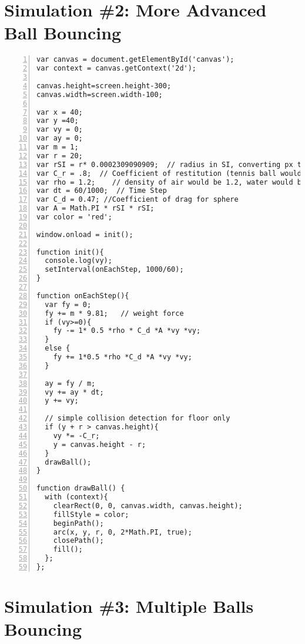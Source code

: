 \section{Simulation \#2: More Advanced Ball Bouncing}

\begin{lstlisting}[breaklines=true, frame=single, numbers=left, caption=More Advanced Ball Bouncing Simulation label=lst:ballbounce2]
var canvas = document.getElementById('canvas');
var context = canvas.getContext('2d');

canvas.height=screen.height-300;
canvas.width=screen.width-100;

var x = 40;
var y =40;
var vy = 0;
var ay = 0;
var m = 1;
var r = 20;
var rSI = r* 0.0002309090909;  // radius in SI, converting px to m
var C_r = .8;  // Coefficient of restitution (tennis ball would be .8)
var rho = 1.2;    // density of air would be 1.2, water would be 1000
var dt = 60/1000;  // Time Step
var C_d = 0.47; //Coefficient of drag for sphere
var A = Math.PI * rSI * rSI;
var color = 'red';

window.onload = init();
  
function init(){
  console.log(vy);
  setInterval(onEachStep, 1000/60);
}

function onEachStep(){ 
  var fy = 0;
  fy += m * 9.81;   // weight force
  if (vy>=0){
    fy -= 1* 0.5 *rho * C_d *A *vy *vy; 
  } 
  else {
    fy += 1*0.5 *rho *C_d *A *vy *vy;
  }

  ay = fy / m;
  vy += ay * dt;
  y += vy;
  
  // simple collision detection for floor only
  if (y + r > canvas.height){ 
    vy *= -C_r; 
    y = canvas.height - r;  
  }
  drawBall();
}

function drawBall() {
  with (context){
    clearRect(0, 0, canvas.width, canvas.height); 
    fillStyle = color;
    beginPath();
    arc(x, y, r, 0, 2*Math.PI, true);
    closePath();
    fill();
  };
};
\end{lstlisting}

\section{Simulation \#3: Multiple Balls Bouncing}

